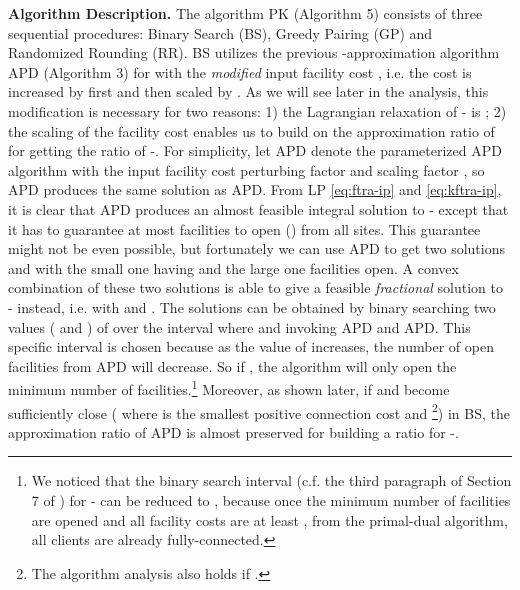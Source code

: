 \documentclass[10pt]{llncs}
\begin{document}
\textbf{Algorithm Description. }The algorithm PK (Algorithm 5) consists
of three sequential procedures: Binary Search (BS), Greedy Pairing
(GP) and Randomized Rounding (RR). BS utilizes the previous -approximation
algorithm APD (Algorithm 3) for  with the \textit{modified}
input facility cost , i.e. the cost is
increased by  first and then scaled by . As we will see
later in the analysis, this modification is necessary for two reasons:
1) the Lagrangian relaxation of - is ; 2) the scaling
of the facility cost enables us to build on the approximation ratio
 of  for getting the ratio of -.
For simplicity, let APD denote the
parameterized APD algorithm with the input facility cost perturbing
factor  and scaling factor , so APD
produces the same solution as APD. From LP \eqref{eq:ftra-ip} and
\eqref{eq:kftra-ip}, it is clear that APD produces an almost feasible
integral solution to - except that it has to guarantee
at most  facilities to open ()
from all sites. This guarantee might not be even possible, but fortunately
we can use APD to get two solutions
 and 
with the small one having 
and the large one  facilities
open. A convex combination of these two solutions is able to give
a feasible \textit{fractional} solution 
to - instead, i.e. 
with  and . The solutions can be obtained
by binary searching two values ( and ) of
 over the interval 
where  and
invoking APD and APD.
This specific interval is chosen because as the value of 
increases, the number of open facilities from APD
will decrease. So if , the algorithm
will only open the minimum number of 
facilities.\footnote{We noticed that the binary search interval 
(c.f. the third paragraph of Section 7 of \cite{Swamy08FTFL2.076})
for - can be reduced to ,
because once the minimum number of 
facilities are opened and all facility costs are at least ,
from the primal-dual algorithm, all clients are already fully-connected.} Moreover, as shown later, if  and  become
sufficiently close ( where 
is the smallest positive connection cost and 
\footnote{The algorithm analysis also holds if .}) in BS, the approximation ratio of APD is almost preserved for building
a ratio for -.
\end{document}
